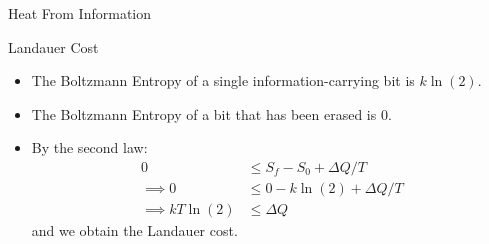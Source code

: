 \begin{frame}{Heat From Information}
\begin{block}{Landauer Cost}
\begin{itemize}
	\item The Boltzmann Entropy of a single information-carrying bit is $k\ln(2)$.
	\item The Boltzmann Entropy of a bit that has been erased is 0.
	\item By the second law:
	\begin{align*}
	0 &\le S_f - S_0 + \Delta Q /T\\
	\implies 0 &\le 0 -k\ln(2) + \Delta Q/T\\
	\implies kT\ln(2) & \le \Delta Q
	\end{align*}
	and we obtain the Landauer cost.
\end{itemize}
\end{block}
\end{frame}

